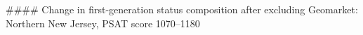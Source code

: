 #### Change in first-generation status composition after excluding Geomarket: Northern New Jersey, PSAT score 1070–1180
